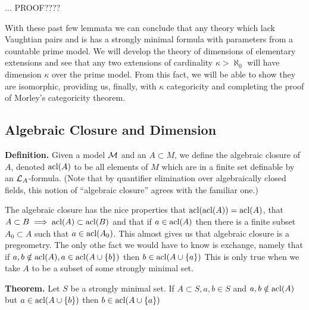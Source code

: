 {\color{red}\(\ldots\) PROOF????}

With these past few lemmata we can conclude that any theory which lack Vaughtian pairs and is \omst has a strongly minimal formula with parameters from a countable prime model. 
We will develop the theory of dimensions of elementary extensions and see that any two extensions of cardinality \(\kappa > \aleph_0\) will have dimension \(\kappa\) over the prime model.
From this fact, we will be able to show they are isomorphic, providing us, finally, with \(\kappa\) categoricity and completing the proof of Morley's categoricity theorem. 

\subsection{Algebraic Closure and Dimension}

\textbf{Definition.} Given a model \(\mathcal{M}\) and an \(A \subset M\), we define the algebraic closure of \(A\), denoted \(\text{acl}(A)\) to be all elements of \(M\) which are in a finite set definable by an \(\mathcal{L}_A\)-formula. 
(Note that by quantifier elimination over algebraically closed fields, this notion of ``algebraic closure'' agrees with the familiar one.)

The algebraic closure has the nice properties that \(\text{acl}(\text{acl}(A)) = \text{acl}(A)\), that \(A \subset B \implies \text{acl}(A) \subset \text{acl}(B)\) and that if \(a \in \text{acl}(A)\) then there is a finite subset \(A_0 \subset A\) such that \(a \in \text{acl}(A_0)\).
This almost gives us that algebraic closure is a pregeometry. 
The only othe fact we would have to know is exchange, namely that if \(a, b \notin \text{acl}(A), a \in \text{acl}(A \cup \{b\})\) then \(b \in \text{acl}(A \cup \{a\})\) 
This is only true when we take \(A\) to be a subset of some strongly minimal set.

\textbf{Theorem.} Let \(S\) be a strongly minimal set. If \(A \subset S, a, b \in S\) and \(a, b \notin \text{acl}(A)\) but \(a \in \text{acl}(A \cup \{b\})\) then \(b \in \text{acl}(A \cup \{a\})\) 


